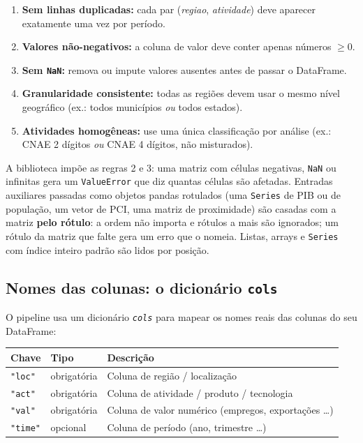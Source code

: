 \documentclass[12pt, a4paper]{article}
\newcommand{\argm}[1]{\textit{\texttt{#1}}}
\begin{document}
\begin{enumerate}[leftmargin=1.5em]
  \item \textbf{Sem linhas duplicadas:} cada par (\textit{regiao},
        \textit{atividade}) deve aparecer exatamente uma vez por per\'{i}odo.
  \item \textbf{Valores n\~{a}o-negativos:} a coluna de valor deve conter
        apenas n\'{u}meros $\geq 0$.
  \item \textbf{Sem \texttt{NaN}:} remova ou impute valores ausentes antes
        de passar o DataFrame.
  \item \textbf{Granularidade consistente:} todas as regi\~{o}es devem usar
        o mesmo n\'{i}vel geogr\'{a}fico (ex.: todos munic\'{i}pios
        \textit{ou} todos estados).
  \item \textbf{Atividades homog\^{e}neas:} use uma \'{u}nica classifica\c{c}\~{a}o
        por an\'{a}lise (ex.: CNAE 2 d\'{i}gitos \textit{ou} CNAE 4
        d\'{i}gitos, n\~{a}o misturados).
\end{enumerate}

\begin{notebox}
  A biblioteca imp\~{o}e as regras 2 e 3: uma matriz com c\'{e}lulas
  negativas, \texttt{NaN} ou infinitas gera um \texttt{ValueError} que diz
  quantas c\'{e}lulas s\~{a}o afetadas. Entradas auxiliares passadas como
  objetos pandas rotulados (uma \texttt{Series} de PIB ou de
  popula\c{c}\~{a}o, um vetor de PCI, uma matriz de proximidade) s\~{a}o
  casadas com a matriz \textbf{pelo r\'{o}tulo}: a ordem n\~{a}o importa e
  r\'{o}tulos a mais s\~{a}o ignorados; um r\'{o}tulo da matriz que falte
  gera um erro que o nomeia. Listas, arrays e \texttt{Series} com
  \'{i}ndice inteiro padr\~{a}o s\~{a}o lidos por posi\c{c}\~{a}o.
\end{notebox}

\subsection{Nomes das colunas: o dicion\'{a}rio \texttt{cols}}

O pipeline usa um dicion\'{a}rio \argm{cols} para mapear os nomes reais
das colunas do seu DataFrame:

\begin{center}
\renewcommand{\arraystretch}{1.3}
\begin{tabular}{lll}
\toprule
\textbf{Chave} & \textbf{Tipo} & \textbf{Descri\c{c}\~{a}o} \\
\midrule
\texttt{"loc"}  & obrigat\'{o}ria & Coluna de regi\~{a}o / localiza\c{c}\~{a}o \\
\texttt{"act"}  & obrigat\'{o}ria & Coluna de atividade / produto / tecnologia \\
\texttt{"val"}  & obrigat\'{o}ria & Coluna de valor num\'{e}rico (empregos, exporta\c{c}\~{o}es \ldots) \\
\texttt{"time"} & opcional        & Coluna de per\'{i}odo (ano, trimestre \ldots) \\
\bottomrule
\end{tabular}
\end{center}
\end{document}
